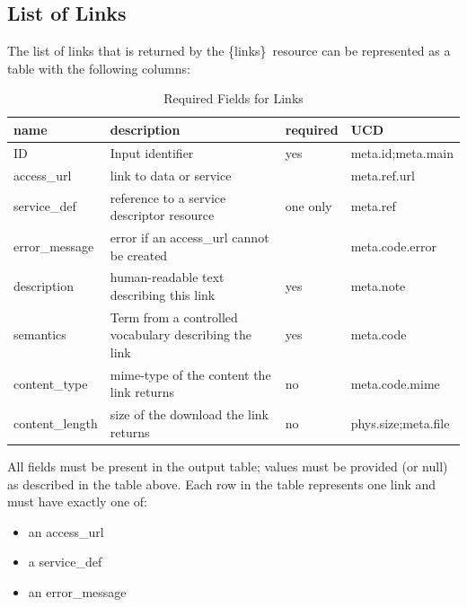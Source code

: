 \documentclass[11pt,a4paper]{ivoa}
\newcommand{\blinks}{\{links\}}
\begin{document}
\subsection{List of Links}

The list of links that is returned by the \blinks\ resource can be
represented as a table with the following columns:
\begin{table}[h]
\begin{center}
\begin{tabular}{|l|p{}|l|l|}
\hline
{\bf name}      & {\bf description} & {\bf required} & {\bf UCD} \\
\hline
ID              & Input identifier & yes & meta.id;meta.main \\
\hline
access\_url     & link to data or service
                &          & meta.ref.url \\
\cline{1-2} \cline{4-4}
service\_def    & reference to a service descriptor resource
                & one only & meta.ref \\
\cline{1-2} \cline{4-4}
error\_message  & error if an access\_url cannot be created
                &          & meta.code.error \\
\hline
description     & human-readable text describing this link
                & yes & meta.note \\
\hline
semantics       & Term from a controlled vocabulary describing the link
                & yes & meta.code \\
\hline
content\_type   & mime-type of the content the link returns
                & no & meta.code.mime \\
\hline
content\_length & size of the download the link returns
                & no & phys.size;meta.file \\
\hline
\end{tabular}
\end{center}
\caption{Required Fields for Links}
\end{table}

All fields must be present in the output table; values must be provided
(or null) as described in the table above. Each row in the table
represents one link and must have exactly one of:
\begin{itemize}
  \item an access\_url
  \item a service\_def
  \item an error\_message
\end{itemize}
\end{document}
